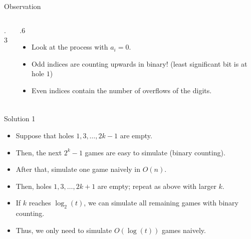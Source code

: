 \begin{frame}
\begin{block}{Observation}
\begin{columns}[T]
\begin{column}{.3\textwidth}
      \end{column}
      \begin{column}{.6 \textwidth}
        \begin{itemize}
          \item Look at the process with $a_i = 0$.
          \pause
          \item Odd indices are counting upwards in binary! (least significant bit is at hole $1$)
          \pause
          \item Even indices contain the number of overflows of the digits.
        \end{itemize}
      \end{column}
    \end{columns}
  \end{block}
\end{frame}

\begin{frame}
  \frametitle{\problemtitle}
  \begin{block}{Solution 1}
    \begin{itemize}
      \item Suppose that holes $1, 3, \ldots, 2k-1$ are empty.
      \item Then, the next $2^k - 1$ games are easy to simulate (binary counting).
      \pause
      \item After that, simulate one game naively in $O(n)$.
      \item Then, holes $1, 3, \ldots, 2k+1$ are empty; repeat as above with larger $k$.
      \pause
      \item If $k$ reaches $\log_2(t)$, we can simulate all remaining games with binary counting.
      \item Thus, we only need to simulate $O(\log(t))$ games naively.
    \end{itemize}
  \end{block}
\end{frame}


